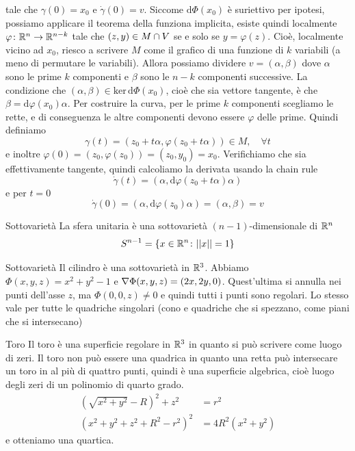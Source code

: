 \documentclass[a4paper]{article}
\begin{document}
tale che \(\gamma(0) = x_0\) e \(\dot\gamma(0)=v\).
Siccome \(\text{d}\Phi(x_0)\) è suriettivo per ipotesi, possiamo applicare il teorema della
funziona implicita, esiste quindi localmente \(\varphi \colon \mathbb{R}^n \to \mathbb{R}^{n-k}\)
tale che \((z,y) \in M \cap V\) se e solo se \(y = \varphi(z)\).
Cioè, localmente vicino ad \(x_0\), riesco a scrivere \(M\) come il grafico di una funzione di \(k\)
variabili (a meno di permutare le variabili).
Allora possiamo dividere \(v = (\alpha, \beta)\)
dove \(\alpha\) sono le prime \(k\) componenti e \(\beta\) sono le \(n-k\) componenti successive.
La condizione che \((\alpha,\beta) \in \text{ker}\,\text{d}\Phi(x_0)\), cioè che sia vettore tangente, è che
\(\beta = \text{d}\varphi(x_0) \alpha\).
Per costruire la curva, per le prime \(k\) componenti scegliamo le rette, e di conseguenza
le altre componenti devono essere \(\varphi\) delle prime. Quindi definiamo
\[
    \gamma(t) = (z_0 + t\alpha, \varphi(z_0 + t\alpha)) \in M, \quad \forall t
\]
e inoltre \(\varphi(0) = (z_0, \varphi(z_0)) = (z_0, y_0) = x_0\).
Verifichiamo che sia effettivamente tangente, quindi calcoliamo la derivata usando la chain rule
\[
    \dot\gamma(t) = (\alpha, \text{d}\varphi(z_0 + t\alpha)\alpha)
\]
e per \(t=0\)
\[
    \dot\gamma(0) = (\alpha, \text{d}\varphi(z_0)\alpha) = (\alpha, \beta) = v
\]

\begin{snippetexample}{Sottovarietà}
    La sfera unitaria è una sottovarietà \((n-1)\)-dimensionale di \(\mathbb{R}^n\)
    \[
        S^{n-1} = \{x\in \mathbb{R}^n \colon ||x|| = 1\}
    \]
\end{snippetexample}

\begin{snippetexample}{Sottovarietà}
    Il cilindro è una sottovarietà in \(\mathbb{R}^3\).
    Abbiamo \(\Phi(x,y,z) = x^2 + y^2 - 1\) e \(\nabla \Phi(x,y,z) = (2x,2y,0)\).
    Quest'ultima si annulla nei punti dell'asse \(z\), ma \(\Phi(0,0,z) \neq 0\)
    e quindi tutti i punti sono regolari.
    Lo stesso vale per tutte le quadriche singolari (cono e quadriche che si spezzano, come piani che si intersecano)
\end{snippetexample}

\begin{snippetexample}{Toro}
    Il toro è una superficie regolare in \(\mathbb{R}^3\) in quanto si può scrivere
    come luogo di zeri.
    Il toro non può essere una quadrica in quanto una retta può intersecare un toro in al più di quattro punti,
    quindi è una superficie algebrica, cioè luogo degli zeri di un polinomio di quarto grado.
    \begin{align*}
        (\sqrt{x^2 + y^2} - R)^2 + z^2 &= r^2 \\
        (x^2 + y^2 + z^2 + R^2 - r^2)^2 &= 4R^2(x^2 + y^2)
    \end{align*}
    e otteniamo una quartica.
\end{snippetexample}
\end{document}
